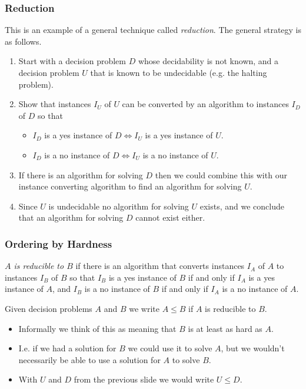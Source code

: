 \documentclass[handout]{beamer}
\begin{document}
\begin{frame}
\frametitle{Reduction}
This is an example of a general technique called \emph{reduction}. The general strategy is as follows.

\begin{enumerate}
\item Start with a decision problem $D$ whose decidability is not known, and a decision problem $U$ that is known to be undecidable (e.g. the halting problem).
\item Show that instances $I_U$ of $U$ can be converted by an algorithm to instances $I_D$ of $D$ so that
\begin{itemize}
\item $I_D$ is a yes instance of $D\iff I_U$ is a yes instance of $U$.
\item $I_D$ is a no instance of $D\iff I_U$ is a no instance of $U$.
\end{itemize}
\item If there is an algorithm for solving $D$ then we could combine this with our instance converting algorithm to find an algorithm for solving $U$.
\item Since $U$ is undecidable no algorithm for solving $U$ exists, and we conclude that an algorithm for solving $D$ cannot exist either.
\end{enumerate}
\end{frame}

\begin{frame}
\frametitle{Ordering by Hardness}

\begin{definition}[reducible]
\emph{$A$ is reducible to $B$} if there is an algorithm that converts instances $I_A$ of $A$ to instances $I_B$ of $B$ so that $I_B$ is a yes instance of $B$ if and only if $I_A$ is a yes instance of $A$, and $I_B$ is a no instance of $B$ if and only if $I_A$ is a no instance of $A$.\end{definition}

\begin{definition}[$A\leq B$]
Given decision problems $A$ and $B$ we write $A\leq B$ if $A$ is reducible to $B$. 
\end{definition} 
\begin{itemize}
\item Informally we think of this as meaning that $B$ is at least as hard as $A$. 
\item I.e. if we had a solution for $B$ we could use it to solve $A$, but we wouldn't necessarily be able to use a solution for $A$ to solve $B$. 
\item With $U$ and $D$ from the previous slide we would write $U\leq D$.
\end{itemize}
\end{frame}
\end{document}
